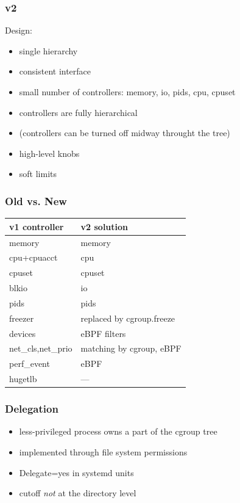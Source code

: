 \documentclass[serif]{beamer}
\begin{document}
\begin{frame}
  \frametitle{v2}

  Design:
  \begin{itemize}
  \item single hierarchy
  \item consistent interface
  \item small number of controllers: memory, io, pids, cpu, cpuset
  \item controllers are fully hierarchical
  \item (controllers can be turned off midway throught the tree)
  \item high-level knobs
  \item soft limits
  \end{itemize}
\end{frame}

\begin{frame}[fragile]
  \frametitle{Old vs. New}

  \begin{tabular}{l|l}
    v1 controller          &  v2 solution\\
    \hline
    memory                 &  memory \\
    cpu+cpuacct            &  cpu    \\
    cpuset                 &  cpuset \\
    blkio                  &  io     \\
    pids                   &  pids   \\[1em]\pause
    freezer                &  replaced by cgroup.freeze\\[1em]\pause
    devices                &  eBPF filters \\[1em]\pause
    net\_cls,net\_prio     &  matching by cgroup, eBPF\\
    perf\_event            &  eBPF\\
    hugetlb                &  —
  \end{tabular}
\end{frame}





\begin{frame}
  \frametitle{Delegation}

  \begin{itemize}
  \item less-privileged process owns a part of the cgroup tree
  \item implemented through file system permissions
  \item Delegate=yes in systemd units
  \item cutoff \emph{not} at the directory level
  \end{itemize}
\end{frame}
\end{document}
